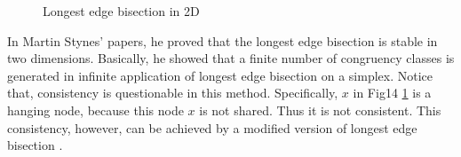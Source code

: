 \begin{figure}[h!]
\centering
{}
\caption{Longest edge bisection in 2D}
\label{Fig14}
\end{figure}

In Martin Stynes' papers, he proved that the longest edge bisection is stable \cite{stynes1979faster,stynes1980faster,stynes1979n} in two dimensions. Basically, he showed that a finite number of congruency classes is generated in infinite application of longest edge bisection on a simplex. Notice that, consistency is questionable in this method. Specifically, $x$ in Fig14 \ref{Fig14} is a hanging node, because this node $x$ is not shared. Thus it is not consistent. This consistency, however, can be achieved by a modified version of longest edge bisection \cite{kˇriˇzek1997generate}.


